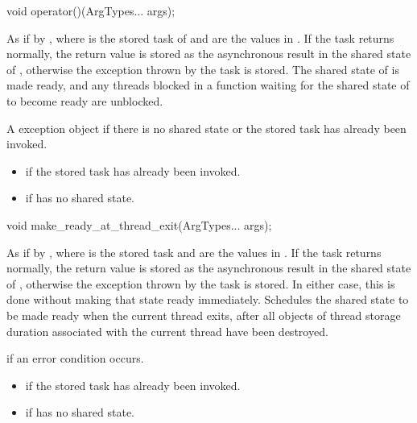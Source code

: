 %
\begin{itemdecl}
void operator()(ArgTypes... args);
\end{itemdecl}

\begin{itemdescr}
\pnum
\effects
As if by ,
where  is the
stored task of  and
 are the values in . If the task returns normally,
the return value is stored as the asynchronous result in the shared state of
, otherwise the exception thrown by the task is stored. The
shared state of  is made ready, and any threads blocked in a
function waiting for
the shared state of  to become ready are unblocked.

\pnum
\throws
A  exception object if there is no shared
state or the stored task has already been invoked.

\pnum
\errors
\begin{itemize}
\item {} if
the stored task has already been invoked.
\item {} if  has no shared state.
\end{itemize}
\end{itemdescr}

%
\begin{itemdecl}
void make_ready_at_thread_exit(ArgTypes... args);
\end{itemdecl}

\begin{itemdescr}
\pnum
\effects
As if by ,
where  is the stored task and
 are the values in . If the task returns normally,
the return value is stored as the asynchronous result in the shared state of
, otherwise the exception thrown by the task is stored. In either
case, this is done without making that state ready immediately. Schedules
the shared state to be made ready when the current thread exits,
after all objects of thread storage duration associated with the current thread
have been destroyed.

\pnum
\throws
{} if an error condition occurs.

\pnum
\errors
\begin{itemize}
\item {} if the
stored task has already been invoked.
\item {} if  has no shared state.
\end{itemize}
\end{itemdescr}

